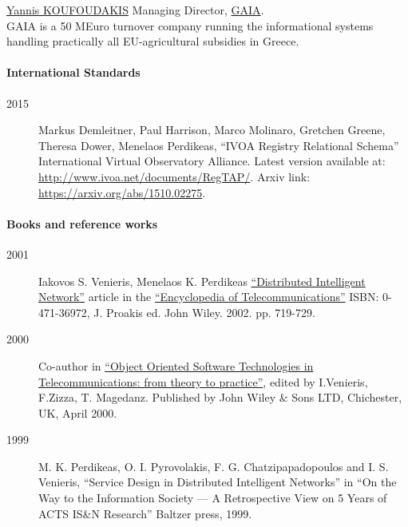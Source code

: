 \documentclass[10pt,a4paper]{article} %
\begin{document}
  \inlineheadsection
      {\href{mailto:i_koufoudakis@c-gaia.gr}{Yannis KOUFOUDAKIS}}
      {Managing Director, \href{https://www.c-gaia.gr/}{GAIA}.
        \\ GAIA is a 50 MEuro turnover company running the informational systems handling
        practically all EU-agricultural subsidies in Greece.}
\fi
\spacedhrule{1.6em}{-0.4em} %



  \paragraph{International Standards}
  \begin{description}
  \item[2015] Markus Demleitner, Paul Harrison, Marco Molinaro, Gretchen Greene, Theresa Dower, Menelaos Perdikeas,
    ``IVOA Registry Relational Schema'' International Virtual Observatory Alliance. Latest version available at:
    \href{http://www.ivoa.net/documents/RegTAP/}{http://www.ivoa.net/documents/RegTAP/}. Arxiv link:
    \href{https://arxiv.org/abs/1510.02275}{https://arxiv.org/abs/1510.02275}.
  \end{description}

  \paragraph{Books and reference works}
  \begin{description}
  \item[2001] Iakovos S. Venieris, Menelaos K. Perdikeas
    \href{http://onlinelibrary.wiley.com/doi/10.1002/0471219282.eot257/full}{``Distributed Intelligent Network''} article in the
    \href{http://eu.wiley.com/WileyCDA/WileyTitle/productCd-0471369721.html}{``Encyclopedia of Telecommunications''} ISBN: 0-471-36972, J. Proakis ed. John Wiley. 2002. pp. 719-729.
  \item[2000] Co-author in \href{http://eu.wiley.com/WileyCDA/WileyTitle/productCd-0471623792.html}{``Object Oriented Software Technologies in Telecommunications: from theory to practice''}, edited by I.Venieris, F.Zizza, T. Magedanz. Published by John Wiley \& Sons LTD, Chichester, UK, April 2000.
  \item[1999] M. K. Perdikeas, O. I. Pyrovolakis, F. G. Chatzipapadopoulos and I. S. Venieris, ``Service Design in Distributed Intelligent Networks'' in ``On the Way to the Information Society --- A Retrospective View on 5 Years of ACTS IS\&N Research'' Baltzer press, 1999.
  \end{description}
\end{document}
